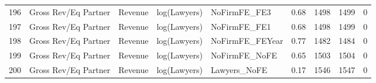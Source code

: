 \documentclass{article}
\begin{document}
\begin{table}[H]
\begin{tabular}{rllllllll}
  196 & Gross Rev/Eq Partner & Revenue & log(Lawyers) & NoFirmFE\_FE3 & 0.68 & 1498 & 1499 & 0 \\ 
  197 & Gross Rev/Eq Partner & Revenue & log(Lawyers) & NoFirmFE\_FE1 & 0.68 & 1498 & 1499 & 0 \\ 
  198 & Gross Rev/Eq Partner & Revenue & log(Lawyers) & NoFirmFE\_FEYear & 0.77 & 1482 & 1484 & 0 \\ 
  199 & Gross Rev/Eq Partner & Revenue & log(Lawyers) & NoFirmFE\_NoFE & 0.65 & 1503 & 1504 & 0 \\ 
  200 & Gross Rev/Eq Partner & Revenue & log(Lawyers) & Lawyers\_NoFE & 0.17 & 1546 & 1547 & 0 \\ 
   \hline
\end{tabular}
\end{table}
\end{document}
